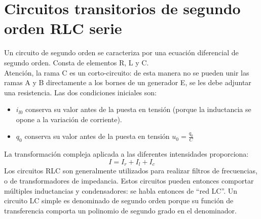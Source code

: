 \documentclass[a4paper,12pt]{report}
\begin{document}
\chapter{Circuitos transitorios de segundo orden RLC serie}
Un circuito de segundo orden se caracteriza por una ecuación diferencial de segundo orden. Consta de elementos R, L y C.\\
Atención, la rama C es un corto-circuito: de esta manera no se pueden unir las ramas A y B directamente a los bornes de un generador E, se les debe adjuntar una resistencia. Las dos condiciones iniciales son:
\begin{itemize}
\item $i_{l0}$ conserva su valor antes de la puesta en tensión (porque la inductancia se opone a la variación de corriente).
\item $q_{0}$ conserva su valor antes de la puesta en tensión $u_{0} = \frac{q_{0}}{C}$ 
\end{itemize}
La transformación compleja aplicada a las diferentes intensidades proporciona:
$$
I = I_{r} + I_{l} + I_{c}
$$
Los circuitos RLC son generalmente utilizados para realizar filtros de frecuencias, o de transformadores de impedancia. Estos circuitos pueden entonces comportar múltiples inductancias y condensadores: se habla entonces de ``red LC''. Un circuito LC simple es denominado de segundo orden porque su función de transferencia comporta un polinomio de segundo grado en el denominador.
\end{document}
